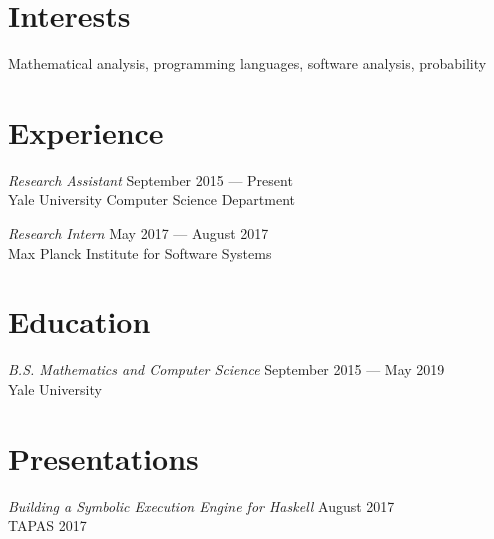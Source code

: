 \documentclass[margin]{res}
\begin{document}
 

 
\address{\textbf{Address} \\
         17 Broadway 2L \\
         New Haven, CT 06511}
 
\address{\textbf{Contact} \\
         \href{antonxue.github.io}{\texttt{antonxue.github.io}} \\
         \texttt{anton.xue@yale.edu}}

\begin{resume} 
 
\section{Interests} 
Mathematical analysis, programming languages, software analysis, probability


\section{Experience}
\textit{Research Assistant} \hfill September 2015 --- Present \\
Yale University Computer Science Department

\textit{Research Intern} \hfill May 2017 --- August 2017 \\
Max Planck Institute for Software Systems

\section{Education} 
\textit{B.S. Mathematics and Computer Science}
  \hfill September 2015 --- May 2019 \\
Yale University



\section{Presentations}
\textit{Building a Symbolic Execution Engine for Haskell}
  \hfill August 2017 \\
TAPAS 2017


\end{resume}
\end{document}
